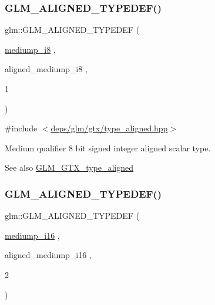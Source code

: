 \subsubsection{\texorpdfstring{G\+L\+M\+\_\+\+A\+L\+I\+G\+N\+E\+D\+\_\+\+T\+Y\+P\+E\+D\+E\+F()}{GLM\_ALIGNED\_TYPEDEF()}\hspace{0.1cm}{\footnotesize\ttfamily [21/209]}}
{\footnotesize\ttfamily glm\+::\+G\+L\+M\+\_\+\+A\+L\+I\+G\+N\+E\+D\+\_\+\+T\+Y\+P\+E\+D\+EF (\begin{DoxyParamCaption}\item[{\hyperlink{group__gtc__type__precision_ga28a8b5fd51072680bb55178c17cc7411}{mediump\+\_\+i8}}]{,  }\item[{aligned\+\_\+mediump\+\_\+i8}]{,  }\item[{1}]{ }\end{DoxyParamCaption})}



{\ttfamily \#include $<$\hyperlink{gtx_2type__aligned_8hpp}{deps/glm/gtx/type\+\_\+aligned.\+hpp}$>$}

Medium qualifier 8 bit signed integer aligned scalar type. \begin{DoxySeeAlso}{See also}
\hyperlink{group__gtx__type__aligned}{G\+L\+M\+\_\+\+G\+T\+X\+\_\+type\+\_\+aligned} 
\end{DoxySeeAlso}
\mbox{\label{group__gtx__type__aligned_ga4b35ca5fe8f55c9d2fe54fdb8d8896f4}} 
\subsubsection{\texorpdfstring{G\+L\+M\+\_\+\+A\+L\+I\+G\+N\+E\+D\+\_\+\+T\+Y\+P\+E\+D\+E\+F()}{GLM\_ALIGNED\_TYPEDEF()}\hspace{0.1cm}{\footnotesize\ttfamily [22/209]}}
{\footnotesize\ttfamily glm\+::\+G\+L\+M\+\_\+\+A\+L\+I\+G\+N\+E\+D\+\_\+\+T\+Y\+P\+E\+D\+EF (\begin{DoxyParamCaption}\item[{\hyperlink{group__gtc__type__precision_ga8454fc6a82c7bb787d0ac9663e08f63d}{mediump\+\_\+i16}}]{,  }\item[{aligned\+\_\+mediump\+\_\+i16}]{,  }\item[{2}]{ }\end{DoxyParamCaption})}



